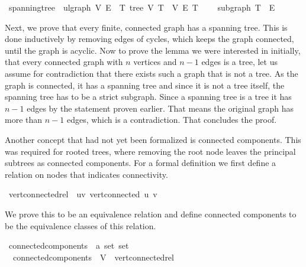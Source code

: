 \begin{isabellebox}
    \isamarkupfalse%
    \ spanning{\isacharunderscore}{\kern0pt}tree\ {\isacharequal}{\kern0pt}\ ulgraph\ V\ E\ {\isacharplus}{\kern0pt}\ T{\isacharcolon}{\kern0pt}\ tree\ V\ T\ \ V\ E\ T\ {\isacharplus}{\kern0pt}\isanewline
    \ \ \ subgraph{\isacharcolon}{\kern0pt}\ {\isachardoublequoteopen}T\ {\isasymsubseteq}\ E{\isachardoublequoteclose}
\end{isabellebox}

Next, we prove that every finite, connected graph has a spanning tree.
This is done inductively by removing edges of cycles, which keeps the graph connected, until the graph is acyclic.
Now to prove the lemma we were interested in initially, that every connected graph with $n$ vertices and $n-1$ edges is a tree,
let us assume for contradiction that there exists such a graph that is not a tree.
As the graph is connected, it has a spanning tree and since it is not a tree itself, the spanning tree has to be a strict subgraph.
Since a spanning tree is a tree it has $n-1$ edges by the statement proven earlier.
That means the original graph has more than $n-1$ edges, which is a contradiction.
That concludes the proof.

Another concept that had not yet been formalized is connected components.
This was required for rooted trees, where removing the root node leaves the principal subtrees as connected components.
For a formal definition we first define a relation on nodes that indicates connectivity.

\begin{isabellebox}
    \isamarkupfalse%
    \ {\isachardoublequoteopen}vert{\isacharunderscore}{\kern0pt}connected{\isacharunderscore}{\kern0pt}rel\ {\isasymequiv}\ {\isacharbraceleft}{\kern0pt}{\isacharparenleft}{\kern0pt}u{\isacharcomma}{\kern0pt}v{\isacharparenright}{\kern0pt}{\isachardot}{\kern0pt}\ vert{\isacharunderscore}{\kern0pt}connected\ u\ v{\isacharbraceright}{\kern0pt}{\isachardoublequoteclose}
\end{isabellebox}

We prove this to be an equivalence relation and define connected components to be the equivalence classes of this relation.

\begin{isabellebox}
    \isamarkupfalse%
    \ connected{\isacharunderscore}{\kern0pt}components\ {\isacharcolon}{\kern0pt}{\isacharcolon}{\kern0pt}\ {\isachardoublequoteopen}{\isacharprime}{\kern0pt}a\ set\ set{\isachardoublequoteclose}\ \isanewline
    \ \ {\isachardoublequoteopen}connected{\isacharunderscore}{\kern0pt}components\ {\isacharequal}{\kern0pt}\ V\ {\isacharslash}{\kern0pt}{\isacharslash}{\kern0pt}\ vert{\isacharunderscore}{\kern0pt}connected{\isacharunderscore}{\kern0pt}rel{\isachardoublequoteclose}
\end{isabellebox}

